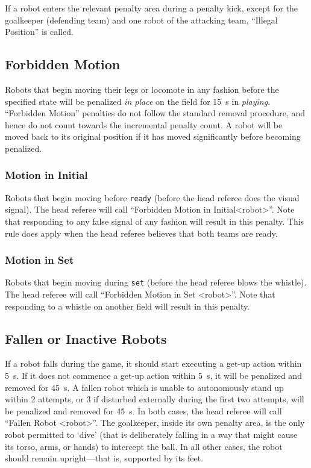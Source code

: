 If a robot enters the relevant penalty area during a penalty kick, except for the goalkeeper (defending team) and one robot of the attacking team, ``Illegal Position'' is called.

\subsection{Forbidden Motion}
Robots that begin moving their legs or locomote in any fashion before the specified state
 will be penalized \textit{in place} on the field for \qty{15}{\second} in \textit{playing}.
``Forbidden Motion'' penalties do not follow the standard removal procedure, and hence do not count towards the incremental penalty count.
A robot will be moved back to its original position if it has moved significantly before becoming penalized.

\subsubsection{Motion in Initial}
\label{sec:motion_in_initial}

Robots that begin moving before \texttt{ready} (\ie before the head referee does the visual signal).
The head referee will call ``Forbidden Motion in Initial\textless robot\textgreater''.
Note that responding to any false signal of any fashion will result in this penalty. This rule does apply when the head referee believes that both teams are ready. 

\subsubsection{Motion in Set}
\label{sec:motion_in_set}

Robots that begin moving during \texttt{set} (\ie before the head referee blows the whistle).
The head referee will call ``Forbidden Motion in Set \textless robot\textgreater''.
Note that responding to a whistle on another field will result in this penalty.

\subsection{Fallen or Inactive Robots}
\label{sec:fallenrobots}

If a robot falls during the game, it should start executing a get-up action within \qty{5}{\second}.
If it does not commence a get-up action within \qty{5}{\second}, it will be penalized and removed for \qty{45}{\second}.
A fallen robot which is unable to autonomously stand up within 2 attempts, or 3 if disturbed externally during the first two attempts, will be penalized and removed for \qty{45}{\second}.
In both cases, the head referee will call ``Fallen Robot  \textless robot\textgreater''.
The goalkeeper, inside its own penalty area, is the only robot permitted to `dive' (that is deliberately falling in a way that might cause its torso, arms, or hands) to intercept the ball.
In all other cases, the robot should remain upright---that is, supported by its feet.

